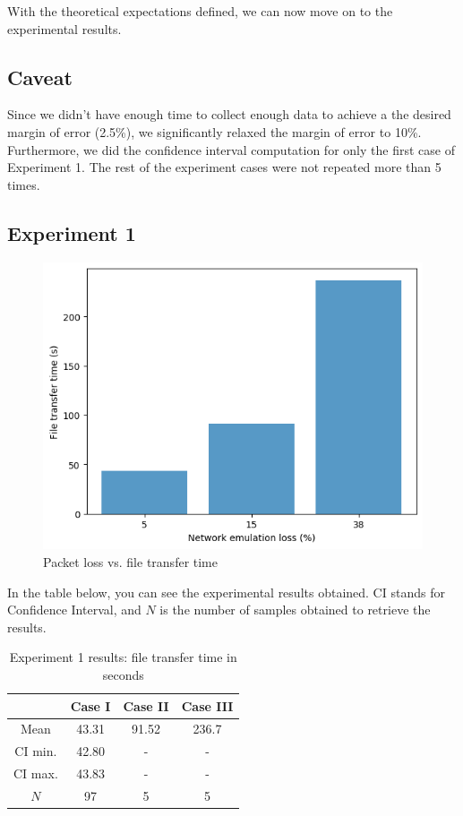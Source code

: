 \documentclass[conference]{IEEEtran}
\begin{document}
With the theoretical expectations defined, we can now move on to the experimental results.

\subsection{Caveat}
Since we didn't have enough time to collect enough data to achieve a the desired margin of error
(2.5\%), we significantly relaxed the margin of error to 10\%. Furthermore, we did the confidence
interval computation for only the first case of Experiment 1. The rest of the experiment cases
were not repeated more than 5 times.

\subsection{Experiment 1}

\begin{figure}
    \center
    \includegraphics[width=\columnwidth]{images/chart}
    \caption{Packet loss vs. file transfer time}
    \label{fig:graphexp1}
\end{figure}

In the table below, you can see the experimental results obtained. CI stands for Confidence Interval,
and $N$ is the number of samples obtained to retrieve the results.

\begin{table}[h]
    \centering
    \renewcommand{\arraystretch}{2.5}
        \begin{tabular}{|c|c|c|c|}
        \hline
                          & Case I & Case II & Case III \\
        \hline
                Mean      & 43.31  & 91.52   & 236.7    \\
        \hline
                CI min.   & 42.80  & -       & -    \\
        \hline
                CI max.   & 43.83  & -       & -    \\
        \hline
                $N$       & 97     & 5       & 5    \\
        \hline
        \end{tabular}
    \caption{Experiment 1 results: file transfer time in seconds}
    \label{table:exp1}
\end{table}
\end{document}

